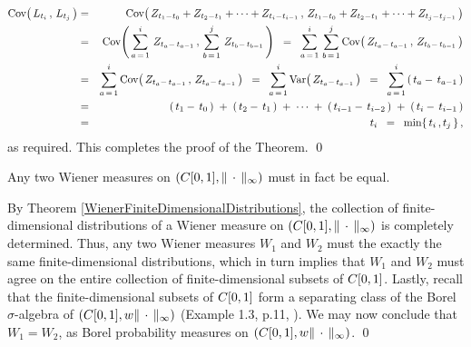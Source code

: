 \begin{eqnarray*}
	\textnormal{Cov}\!\left(\,L_{t_{i}}\,,\,L_{t_{j}}\,\right)
	& = & \textnormal{Cov}\!\left(\,
		Z_{t_{1}-t_{0}} + Z_{t_{2}-t_{1}} + \cdots + Z_{t_{i} - t_{i-1}}\,,\,
		Z_{t_{1}-t_{0}} + Z_{t_{2}-t_{1}} + \cdots + Z_{t_{j} - t_{j-1}}
		\,\right)
	\\
	& = & \textnormal{Cov}\!\left(\,
		\sum_{a\,=\,1}^{i}\,Z_{t_{a}-\,t_{a-1}} \,,\,
		\sum_{b\,=\,1}^{j}\,Z_{t_{b}-\,t_{b-1}}
		\,\right)
	\;\; = \;\; \sum_{a\,=\,1}^{i}\,\sum_{b\,=\,1}^{j}\textnormal{Cov}\!\left(\,Z_{t_{a}-\,t_{a-1}}\,,\,Z_{t_{b}-\,t_{b-1}}\,\right)
	\\
	& = & \sum_{a\,=\,1}^{i}\textnormal{Cov}\!\left(\,Z_{t_{a}-\,t_{a-1}}\,,\,Z_{t_{a}-\,t_{a-1}}\,\right)
	\;\;=\;\; \sum_{a\,=\,1}^{i}\textnormal{Var}\!\left(\,Z_{t_{a}-\,t_{a-1}}\,\right)
	\;\;=\;\; \sum_{a\,=\,1}^{i}\left(\,t_{a}-\,t_{a-1}\,\right)
	\\
	& = & \left(\,t_{1}-\,t_{0}\,\right) \;+\; \left(\,t_{2}-\,t_{1}\,\right)
		\;+\; \cdots 
		\;+\; \left(\,t_{i-1}-\,t_{i-2}\,\right) \;+\; \left(\,t_{i}-\,t_{i-1}\,\right)
	\\
	& = & t_{i} \;\; = \;\; \min\!\left\{\,t_{i}\,,t_{j}\,\right\},
\end{eqnarray*}
as required.
This completes the proof of the Theorem.
\qed

\begin{theorem}
\label{WienerMeasureUniqueness}
\mbox{}\vskip 0.2cm
\noindent
Any two Wiener measures on $\left(C[0,1],\Vert\,\cdot\,\Vert_{\infty}\right)$ must in fact be equal.
\end{theorem}
\proof
By Theorem \ref{WienerFiniteDimensionalDistributions}, the collection of finite-dimensional distributions
of a Wiener measure on $\left(C[0,1],\Vert\,\cdot\,\Vert_{\infty}\right)$ is completely determined.
Thus, any two Wiener measures $W_{1}$ and $W_{2}$ must the exactly the same finite-dimensional distributions,
which in turn implies that $W_{1}$ and $W_{2}$ must agree on the entire collection of finite-dimensional
subsets of $C[0,1]$. Lastly, recall that the finite-dimensional subsets of $C[0,1]$ form a separating class of the
Borel $\sigma$-algebra of $\left(C[0,1],w\Vert\,\cdot\,\Vert_{\infty}\right)$ (Example 1.3, p.11, \cite{Billingsley1999}).
We may now conclude that $W_{1} = W_{2}$, as Borel probability measures on
$\left(C[0,1],w\Vert\,\cdot\,\Vert_{\infty}\right)$.
\qed

